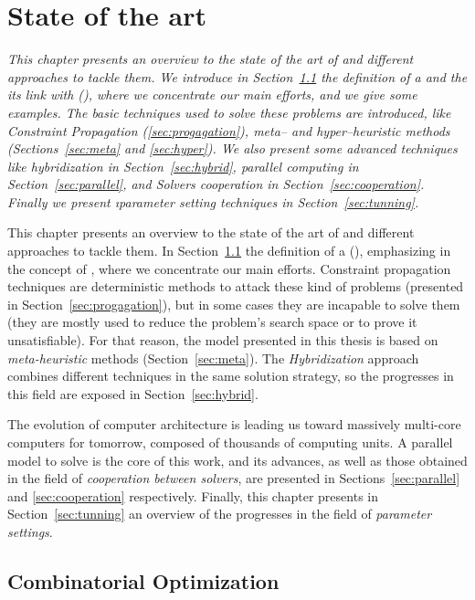 \chapter{State of the art}
\label{chap:Art}
\textit{This chapter presents an overview to the state of the art of \COPs{} and different approaches to tackle them. We introduce in Section~\ref{sec:combi} the definition of a \COP{} and the its link with \CSPs{} (\csp), where we concentrate our main efforts, and we give some examples. The basic techniques used to solve these problems are introduced, like {\it Constraint Propagation} (\ref{sec:progagation}), {\it meta-- and hyper--heuristic methods} (Sections~\ref{sec:meta} and \ref{sec:hyper}). We also present some advanced techniques like {\it hybridization} in Section~\ref{sec:hybrid}, {\it parallel computing} in Section~\ref{sec:parallel}, and {\it Solvers cooperation} in Section~\ref{sec:cooperation}. Finally we present {\i parameter setting techniques} in Section~\ref{sec:tunning}.}
\vfill
\minitoc
\newpage

This chapter presents an overview to the state of the art of \COPs{} and different approaches to tackle them. In Section~\ref{sec:combi} the definition of a \CSP{} (\csp), emphasizing in the concept of \CSPs, where we concentrate our main efforts. Constraint propagation techniques are deterministic methods to attack these kind of problems (presented in Section~\ref{sec:progagation}), but in some cases they are incapable to solve them (they are mostly used to reduce the problem's search space or to prove it unsatisfiable). For that reason, the model presented in this thesis is based on \textit{meta-heuristic} methods (Section~\ref{sec:meta}). The \textit{Hybridization} approach combines different techniques in the same solution strategy, so the progresses in this field are exposed in Section~\ref{sec:hybrid}.

The evolution of computer architecture is leading us toward massively multi-core computers for tomorrow, composed of thousands of computing units. A parallel model to solve \csps{} is the core of this work, and its advances, as well as those obtained in the field of \textit{cooperation between solvers}, are presented in Sections~\ref{sec:parallel} and \ref{sec:cooperation} respectively. Finally, this chapter presents in Section~\ref{sec:tunning} an overview of the progresses in the field of \textit{parameter settings}.  

\section{Combinatorial Optimization}
\label{sec:combi}

